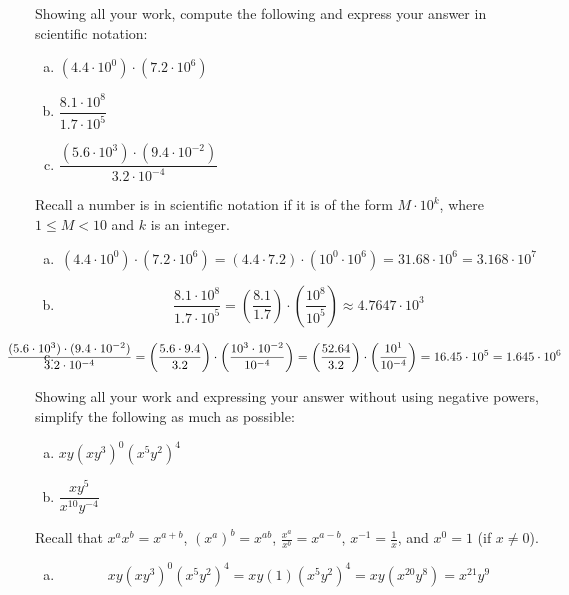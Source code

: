 \documentclass[12pt,letterpaper]{exam}
\begin{document}
\begin{questions}
\newpage
\question[10] Showing all your work, compute the following and express your answer in scientific notation:
	\begin{enumerate}[(a)]
	\item $(4.4 \cdot 10^0) \cdot (7.2 \cdot 10^6)$
	\item $\dfrac{8.1 \cdot 10^8}{1.7 \cdot 10^5}$
	\item $\dfrac{(5.6 \cdot 10^3) \cdot (9.4 \cdot 10^{-2})}{3.2 \cdot 10^{-4}}$
	\end{enumerate} \pspace

\sol Recall a number is in scientific notation if it is of the form $M \cdot 10^k$, where $1 \leq M < 10$ and $k$ is an integer. \pspace

\begin{enumerate}[(a)]
\item 
	\[
	(4.4 \cdot 10^0) \cdot (7.2 \cdot 10^6)= (4.4 \cdot 7.2) \cdot (10^0 \cdot 10^6)= 31.68 \cdot 10^6= 3.168 \cdot 10^7
	\] \pspace

\item 
	\[
	\dfrac{8.1 \cdot 10^8}{1.7 \cdot 10^5}= \left( \dfrac{8.1}{1.7} \right) \cdot \left( \dfrac{10^8}{10^5} \right) \approx 4.7647 \cdot 10^3
	\] \pspace

\item 
	\[
	\hspace{-1.5cm} \dfrac{(5.6 \cdot 10^3) \cdot (9.4 \cdot 10^{-2})}{3.2 \cdot 10^{-4}}= \left( \dfrac{5.6 \cdot 9.4}{3.2} \right) \cdot \left( \dfrac{10^3 \cdot 10^{-2}}{10^{-4}} \right)= \left( \dfrac{52.64}{3.2} \right) \cdot \left( \dfrac{10^1}{10^{-4}} \right)= 16.45 \cdot 10^5= 1.645 \cdot 10^6
	\]
\end{enumerate}



\newpage
\question[10] Showing all your work and expressing your answer without using negative powers, simplify the following as much as possible:
	\begin{enumerate}[(a)]
	\item $xy(xy^3)^0 (x^5y^2)^4$
	\item $\dfrac{x y^5}{x^{10} y^{-4}}$
	\end{enumerate} \pspace

\sol Recall that $x^a x^b= x^{a+b}$, $(x^a)^b= x^{ab}$, $\frac{x^a}{x^b}= x^{a-b}$, $x^{-1}= \frac{1}{x}$, and $x^0= 1$ (if $x \neq 0$). \pspace

\begin{enumerate}[(a)]
\item 
	\[
	xy(xy^3)^0 (x^5y^2)^4= xy(1)(x^5y^2)^4= xy(x^{20} y^8)= x^{21} y^9
	\] \pspace


\end{enumerate}
\end{questions}
\end{document}
